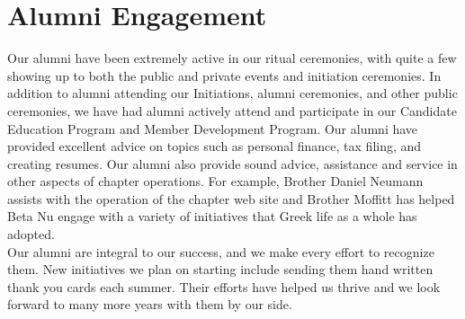   \section*{Alumni Engagement}
    Our alumni have been extremely active in our ritual ceremonies, with quite a few showing up to both the public and private events and initiation ceremonies. In addition to alumni attending our Initiations, alumni ceremonies, and other public ceremonies, we have had alumni actively attend and participate in our Candidate Education Program and Member Development Program. Our alumni have provided excellent advice on topics such as personal finance, tax filing, and creating resumes. Our alumni also provide sound advice, assistance and service in other aspects of chapter operations. For example, Brother Daniel Neumann assists with the operation of the chapter web site and Brother Moffitt has helped Beta Nu engage with a variety of initiatives that Greek life as a whole has adopted.  \\

    Our alumni are integral to our success, and we make every effort to recognize them. New initiatives we plan on starting include sending them hand written thank you cards each summer. Their efforts have helped us thrive and we look forward to many more years with them by our side.